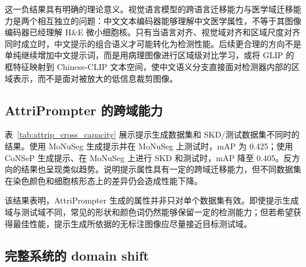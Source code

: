 这一负结果具有明确的理论意义。视觉语言模型的跨语言迁移能力与医学域迁移能力是两个相互独立的问题：中文文本编码器能够理解中文医学属性，不等于其图像编码器已经理解 H\&E 微小细胞核。只有当语言对齐、视觉域对齐和区域尺度对齐同时成立时，中文提示的组合语义才可能转化为检测性能。后续更合理的方向不是单纯继续增加中文提示词，而是用病理图像进行区域级对比学习，或将 GLIP 的框特征映射到 Chinese-CLIP 文本空间，使中文语义分支直接面对检测器内部的区域表示，而不是面对被放大的低信息裁剪图像。

\subsection{AttriPrompter 的跨域能力}

表~\ref{tab:attrip_cross_capacity} 展示提示生成数据集和 SKD/测试数据集不同时的结果。使用 MoNuSeg 生成提示并在 MoNuSeg 上测试时，mAP 为 0.425；使用 CoNSeP 生成提示、在 MoNuSeg 上进行 SKD 和测试时，mAP 降至 0.405。反方向的结果也呈现类似趋势。说明提示属性具有一定的跨域迁移能力，但不同数据集在染色颜色和细胞核形态上的差异仍会造成性能下降。

\begin{table}[t]
\caption{AttriPrompter 跨域检测结果}
\label{tab:attrip_cross_capacity}
\begin{center}
\end{center}
\vskip -0.15in
\end{table}

该结果表明，AttriPrompter 生成的属性并非只对单个数据集有效。即使提示生成域与测试域不同，常见的形状和颜色词仍然能够保留一定的检测能力；但若希望获得最佳性能，提示生成所依据的无标注图像应尽量接近目标测试域。

\subsection{完整系统的 domain shift}


